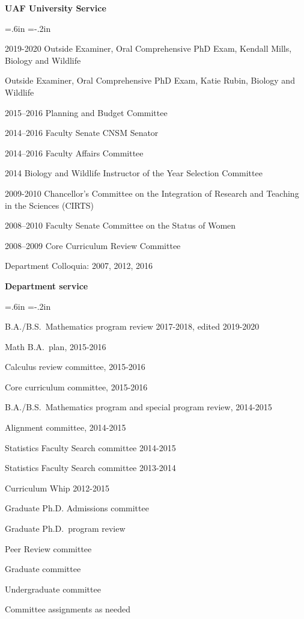 \documentclass[10pt]{report}
\begin{document}
{
{\bf UAF University Service}

\medskip

{ \leftskip=.6in \parindent=-.2in  \parskip=3pt

2019-2020 Outside Examiner, Oral Comprehensive PhD Exam, Kendall Mills, Biology and Wildlife

\hskip 1.65cm Outside Examiner, Oral Comprehensive PhD Exam, Katie Rubin, Biology and Wildlife

2015--2016 Planning and Budget Committee

2014--2016 Faculty Senate CNSM Senator

2014--2016 Faculty Affairs Committee

2014 Biology and Wildlife Instructor of the Year Selection Committee

2009-2010 Chancellor's Committee on the Integration of Research and Teaching in
the Sciences (CIRTS)

2008--2010 Faculty Senate Committee on the Status of Women

2008--2009 Core Curriculum Review Committee

Department Colloquia: 2007, 2012, 2016


}
}
{}

{
{\bf Department service}

\medskip

{ \leftskip=.6in \parindent=-.2in  \parskip=3pt

B.A./B.S.~Mathematics program review 2017-2018, edited 2019-2020

Math B.A.~plan, 2015-2016

Calculus review committee, 2015-2016

Core curriculum committee, 2015-2016

B.A./B.S.~Mathematics program and special program review, 2014-2015

Alignment committee, 2014-2015

Statistics Faculty Search committee 2014-2015

Statistics Faculty Search committee 2013-2014

Curriculum Whip 2012-2015

Graduate Ph.D. Admissions committee

Graduate Ph.D.~program review

Peer Review committee

Graduate committee

Undergraduate committee

Committee assignments as needed

}
}
{}
\end{document}
